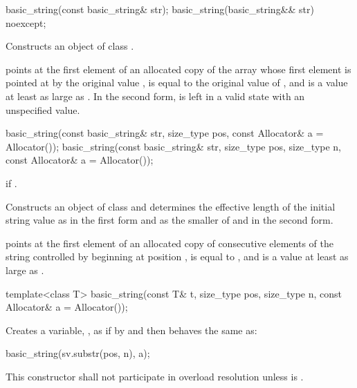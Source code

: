 %
\begin{itemdecl}
basic_string(const basic_string& str);
basic_string(basic_string&& str) noexcept;
\end{itemdecl}

\begin{itemdescr}
\pnum
\effects
Constructs an object of class .

\pnum
\postconditions
{} points at the first element of an allocated copy
of the array whose first element is pointed at by the original
value ,  is equal to the
original value of , and  is a value
at least as large as .
In the second form,  is left in a valid state with an unspecified value.
\end{itemdescr}

%
\begin{itemdecl}
basic_string(const basic_string& str, size_type pos,
             const Allocator& a = Allocator());
basic_string(const basic_string& str, size_type pos, size_type n,
             const Allocator& a = Allocator());
\end{itemdecl}

\begin{itemdescr}
\pnum
\throws
{}
if
.

\pnum
\effects
Constructs an object of class
and determines the effective length  of the initial string
value as  in the first form and
as the smaller of  and  in the second form.

\pnum
\postconditions
{} points at the first element of an allocated copy of 
consecutive elements of the string controlled by  beginning at position
,  is equal to , and  is a
value at least as large as .
\end{itemdescr}

%
\begin{itemdecl}
template<class T>
  basic_string(const T& t, size_type pos, size_type n, const Allocator& a = Allocator());
\end{itemdecl}

\begin{itemdescr}
\pnum
\effects Creates a variable, ,
as if by 
and then behaves the same as:
\begin{codeblock}
basic_string(sv.substr(pos, n), a);
\end{codeblock}

\pnum
\remarks This constructor shall not participate in overload resolution
unless 
is .
\end{itemdescr}

